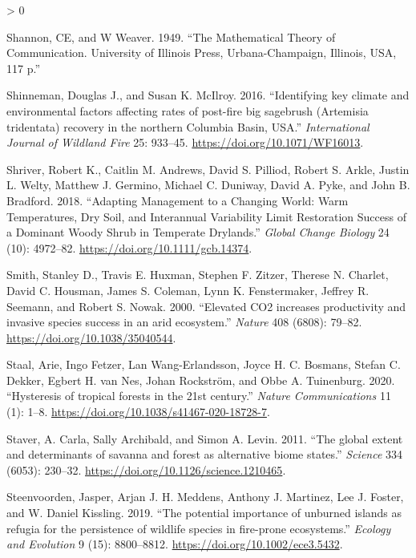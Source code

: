 \documentclass[
  12pt,
]{article}
\newlength{\cslhangindent}
\newenvironment{CSLReferences}[2] %
 {%
  \setlength{\parindent}{0pt}
  \ifodd #1 \everypar{\setlength{\hangindent}{\cslhangindent}}\ignorespaces\fi
  \ifnum #2 > 0
  \setlength{\parskip}{#2\baselineskip}
  \fi
 }%
 {}
\begin{document}
\begin{CSLReferences}{1}{0}
\leavevmode\hypertarget{ref-Shannon1949}{}%
Shannon, CE, and W Weaver. 1949. {``The Mathematical Theory of
Communication. University of Illinois Press, Urbana-Champaign, Illinois,
USA, 117 p.''}

\leavevmode\hypertarget{ref-Shinneman2016}{}%
Shinneman, Douglas J., and Susan K. McIlroy. 2016. {``{Identifying key
climate and environmental factors affecting rates of post-fire big
sagebrush (Artemisia tridentata) recovery in the northern Columbia
Basin, USA}.''} \emph{International Journal of Wildland Fire} 25:
933--45. \url{https://doi.org/10.1071/WF16013}.

\leavevmode\hypertarget{ref-Shriver2018}{}%
Shriver, Robert K., Caitlin M. Andrews, David S. Pilliod, Robert S.
Arkle, Justin L. Welty, Matthew J. Germino, Michael C. Duniway, David A.
Pyke, and John B. Bradford. 2018. {``Adapting Management to a Changing
World: {Warm} Temperatures, Dry Soil, and Interannual Variability Limit
Restoration Success of a Dominant Woody Shrub in Temperate Drylands.''}
\emph{Global Change Biology} 24 (10): 4972--82.
\url{https://doi.org/10.1111/gcb.14374}.

\leavevmode\hypertarget{ref-Smith2000}{}%
Smith, Stanley D., Travis E. Huxman, Stephen F. Zitzer, Therese N.
Charlet, David C. Housman, James S. Coleman, Lynn K. Fenstermaker,
Jeffrey R. Seemann, and Robert S. Nowak. 2000. {``{Elevated CO2
increases productivity and invasive species success in an arid
ecosystem}.''} \emph{Nature} 408 (6808): 79--82.
\url{https://doi.org/10.1038/35040544}.

\leavevmode\hypertarget{ref-Staal2020}{}%
Staal, Arie, Ingo Fetzer, Lan Wang-Erlandsson, Joyce H. C. Bosmans,
Stefan C. Dekker, Egbert H. van Nes, Johan Rockström, and Obbe A.
Tuinenburg. 2020. {``{Hysteresis of tropical forests in the 21st
century}.''} \emph{Nature Communications} 11 (1): 1--8.
\url{https://doi.org/10.1038/s41467-020-18728-7}.

\leavevmode\hypertarget{ref-Staver2011}{}%
Staver, A. Carla, Sally Archibald, and Simon A. Levin. 2011. {``{The
global extent and determinants of savanna and forest as alternative
biome states}.''} \emph{Science} 334 (6053): 230--32.
\url{https://doi.org/10.1126/science.1210465}.

\leavevmode\hypertarget{ref-Steenvoorden2019}{}%
Steenvoorden, Jasper, Arjan J. H. Meddens, Anthony J. Martinez, Lee J.
Foster, and W. Daniel Kissling. 2019. {``{The potential importance of
unburned islands as refugia for the persistence of wildlife species in
fire-prone ecosystems}.''} \emph{Ecology and Evolution} 9 (15):
8800--8812. \url{https://doi.org/10.1002/ece3.5432}.


\end{CSLReferences}
\end{document}
